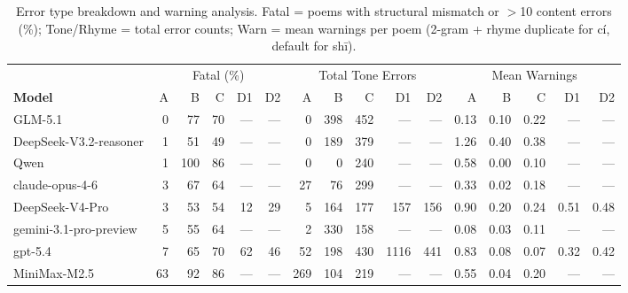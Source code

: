 \begin{table}[t]
\centering
\small
\caption{Error type breakdown and warning analysis. Fatal = poems with structural mismatch or $>$10 content errors (\%); Tone/Rhyme = total error counts; Warn = mean warnings per poem (2-gram + rhyme duplicate for cí, default for shī).}
\label{tab:error-breakdown}
\begin{tabular}{l|rrrrr|rrrrr|rrrrr}
\toprule
& \multicolumn{5}{c|}{Fatal (\%)} & \multicolumn{5}{c|}{Total Tone Errors} & \multicolumn{5}{c}{Mean Warnings} \\
\textbf{Model} & A & B & C & D1 & D2 & A & B & C & D1 & D2 & A & B & C & D1 & D2 \\
\midrule
GLM-5.1 & 0 & 77 & 70 & — & — & 0 & 398 & 452 & — & — & 0.13 & 0.10 & 0.22 & — & — \\
DeepSeek-V3.2-reasoner & 1 & 51 & 49 & — & — & 0 & 189 & 379 & — & — & 1.26 & 0.40 & 0.38 & — & — \\
Qwen & 1 & 100 & 86 & — & — & 0 & 0 & 240 & — & — & 0.58 & 0.00 & 0.10 & — & — \\
claude-opus-4-6 & 3 & 67 & 64 & — & — & 27 & 76 & 299 & — & — & 0.33 & 0.02 & 0.18 & — & — \\
DeepSeek-V4-Pro & 3 & 53 & 54 & 12 & 29 & 5 & 164 & 177 & 157 & 156 & 0.90 & 0.20 & 0.24 & 0.51 & 0.48 \\
gemini-3.1-pro-preview & 5 & 55 & 64 & — & — & 2 & 330 & 158 & — & — & 0.08 & 0.03 & 0.11 & — & — \\
gpt-5.4 & 7 & 65 & 70 & 62 & 46 & 52 & 198 & 430 & 1116 & 441 & 0.83 & 0.08 & 0.07 & 0.32 & 0.42 \\
MiniMax-M2.5 & 63 & 92 & 86 & — & — & 269 & 104 & 219 & — & — & 0.55 & 0.04 & 0.20 & — & — \\
\bottomrule
\end{tabular}
\end{table}

